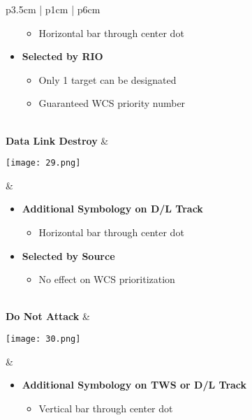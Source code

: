 \documentclass[8pt,usenames,dvipsnames,twoside]{article}
\begin{document}
\begin{center}
\begin{longtable}{p{3.5cm} | p{1cm} |  p{6cm}}
\begin{minipage}[t]{\linewidth}
\begin{itemize}
\begin{itemize}
							\item Horizontal bar through center dot
						\end{itemize}
						\item \textbf{Selected by RIO}
						\begin{itemize}
							\item Only 1 target can be designated
							\item Guaranteed WCS priority number
						\end{itemize}
					\end{itemize}
				\end{minipage} \\
				\midrule
				\textbf{Data Link Destroy }&
				\begin{minipage}[t]{\linewidth}
					\vspace{-7pt}
					\centering
					\texttt{[image: 29.png]}
				\end{minipage} &  
				\begin{minipage}[t]{\linewidth}
					\vspace{-7pt}
					\begin{itemize}
						\item \textbf{Additional Symbology on D/L Track}
						\begin{itemize}
							\item Horizontal bar through center dot
						\end{itemize}
						\item \textbf{Selected by Source}
						\begin{itemize}
							\item No effect on WCS prioritization
						\end{itemize}
					\end{itemize}
				\end{minipage} \\
				\midrule
				\textbf{Do Not Attack} &
				\begin{minipage}[t]{\linewidth}
					\vspace{-7pt}
					\centering
					\texttt{[image: 30.png]}
				\end{minipage} &  
				\begin{minipage}[t]{\linewidth}
					\vspace{-7pt}
					\begin{itemize}
						\item \textbf{Additional Symbology on TWS or D/L Track}
						\begin{itemize}
							\item Vertical bar through center dot

\end{itemize}
\end{itemize}
\end{minipage}
\end{longtable}
\end{center}
\end{document}
